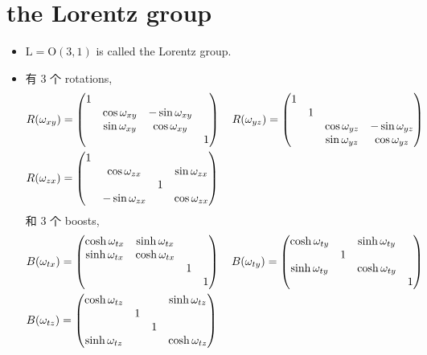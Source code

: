 \section{the Lorentz group}
\begin{itemize}
	\item $\mathrm{L} = \mathrm{O}(3, 1)$ is called the Lorentz group.
	
	\item 有 3 个 rotations,
	\begin{align}
		& R(\omega_{x y}) = \begin{pmatrix}
			1 & & & \\
			& \cos \omega_{x y} & - \sin \omega_{x y} & \\
			& \sin \omega_{x y} & \cos \omega_{x y} & \\
			& & & 1
		\end{pmatrix} \quad R(\omega_{y z}) = \begin{pmatrix}
			1 & & & \\
			& 1 & & \\
			& & \cos \omega_{y z} & - \sin \omega_{y z} \\
			& & \sin \omega_{y z} & \cos \omega_{y z}
		\end{pmatrix} \notag \\
		& R(\omega_{z x}) = \begin{pmatrix}
			1 & & & \\
			& \cos \omega_{z x} & & \sin \omega_{z x} \\
			& & 1 & \\
			& - \sin \omega_{z x} & & \cos \omega_{z x}
		\end{pmatrix} \label{13.2.1}
	\end{align}
	和 3 个 boosts,
	\begin{align}
		& B(\omega_{t x}) = \begin{pmatrix}
			\cosh \omega_{t x} & \sinh \omega_{t x} & & \\
			\sinh \omega_{t x} & \cosh \omega_{t x} & & \\
			& & 1 & \\
			& & & 1
		\end{pmatrix} \quad B(\omega_{t y}) = \begin{pmatrix}
			\cosh \omega_{t y} & & \sinh \omega_{t y} & \\
			& 1 & & \\
			\sinh \omega_{t y} & & \cosh \omega_{t y} & \\
			& & & 1
		\end{pmatrix} \notag \\
		& B(\omega_{t z}) = \begin{pmatrix}
			\cosh \omega_{t z} & & & \sinh \omega_{t z} \\
			& 1 & & \\
			& & 1 & \\
			\sinh \omega_{t z} & & & \cosh \omega_{t z}
		\end{pmatrix} \label{13.2.2}
	\end{align}
\end{itemize}

